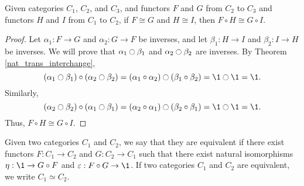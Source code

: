 \documentclass[../math.tex]{subfiles}
\begin{document}
\begin{theorem}
    Given categories $C_1$, $C_2$, and $C_3$, and functors $F$ and $G$ from
    $C_2$ to $C_3$ and functors $H$ and $I$ from $C_1$ to $C_2$, if $F \cong G$
    and $H \cong I$, then $F \circ H \cong G \circ I$.
\end{theorem}
\begin{proof}
    Let $\alpha_1 : F \to G$ and $\alpha_2 : G \to F$ be inverses, and let
    $\beta_1 : H \to I$ and $\beta_2 : I \to H$ be inverses.  We will prove that
    $\alpha_1 \ocircle \beta_1$ and $\alpha_2 \ocircle \beta_2$ are inverses.
    By Theorem \ref{nat_trans_interchange},
    \[
        (\alpha_1 \ocircle \beta_1) \circ (\alpha_2 \ocircle \beta_2)
        = (\alpha_1 \circ \alpha_2) \ocircle (\beta_1 \circ \beta_2)
        = \1 \ocircle \1 = \1.
    \]
    Similarly,
    \[
        (\alpha_2 \ocircle \beta_2) \circ (\alpha_1 \ocircle \beta_1)
        = (\alpha_2 \circ \alpha_1) \ocircle (\beta_2 \circ \beta_1)
        = \1 \ocircle \1 = \1.
    \]
    Thus, $F \circ H \cong G \circ I$.
\end{proof}

\begin{definition}
    Given two categories $C_1$ and $C_2$, we say that they are equivalent if
    there exist functors $F : C_1 \to C_2$ and $G : C_2 \to C_1$ such that there
    exist natural isomorphisms $\eta : \1 \to G \circ F$ and $\varepsilon : F
    \circ G \to \1$.  If two categories $C_1$ and $C_2$ are equivalent, we write
    $C_1 \simeq C_2$.
\end{definition}
\end{document}
